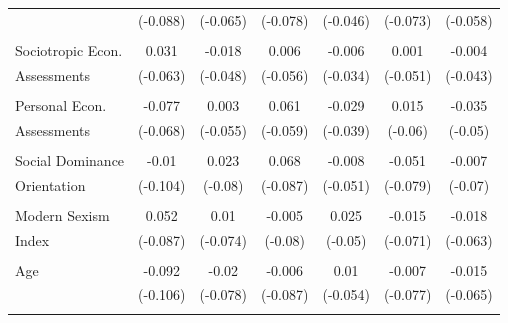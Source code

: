 \documentclass[12pt]{article}
\begin{document}
\begin{appendices}
\begin{refsection}
\begin{table}[!ht]
\begin{adjustbox}{width=\textwidth,center}
\begin{tabular}{@{\extracolsep{5pt}}lcccccc}
                     & (-0.088)           & (-0.065) & (-0.078)  & (-0.046)          & (-0.073) & (-0.058)      \\
                     &                    &          &           &                   &          &               \\
Sociotropic Econ.    & 0.031              & -0.018   & 0.006     & -0.006            & 0.001    & -0.004        \\
Assessments          & (-0.063)           & (-0.048) & (-0.056)  & (-0.034)          & (-0.051) & (-0.043)      \\
                     &                    &          &           &                   &          &               \\
Personal Econ.       & -0.077             & 0.003    & 0.061     & -0.029            & 0.015    & -0.035        \\
Assessments          & (-0.068)           & (-0.055) & (-0.059)  & (-0.039)          & (-0.06)  & (-0.05)       \\
                     &                    &          &           &                   &          &               \\
Social Dominance     & -0.01              & 0.023    & 0.068     & -0.008            & -0.051   & -0.007        \\
Orientation          & (-0.104)           & (-0.08)  & (-0.087)  & (-0.051)          & (-0.079) & (-0.07)       \\
                     &                    &          &           &                   &          &               \\
Modern Sexism        & 0.052              & 0.01     & -0.005    & 0.025             & -0.015   & -0.018        \\
Index                & (-0.087)           & (-0.074) & (-0.08)   & (-0.05)           & (-0.071) & (-0.063)      \\
                     &                    &          &           &                   &          &               \\
Age                  & -0.092             & -0.02    & -0.006    & 0.01              & -0.007   & -0.015        \\
                     & (-0.106)           & (-0.078) & (-0.087)  & (-0.054)          & (-0.077) & (-0.065)      \\
                     &                    &          &           &                   &          &               \\

\end{tabular}
\end{adjustbox}
\end{table}
\end{refsection}
\end{appendices}
\end{document}
